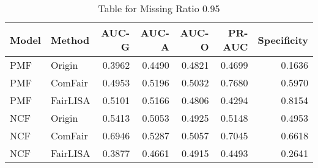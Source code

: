 \begin{table}
\centering
\caption{Table for Missing Ratio 0.95}
\label{tab:missing_0.95}
\begin{tabular}{llrrrrr}
\toprule
Model &   Method &  AUC-G &  AUC-A &  AUC-O &  PR-AUC &  Specificity \\
\midrule
  PMF &   Origin & 0.3962 & 0.4490 & 0.4821 &  0.4699 &       0.1636 \\
  PMF &  ComFair & 0.4953 & 0.5196 & 0.5032 &  0.7680 &       0.5970 \\
  PMF & FairLISA & 0.5101 & 0.5166 & 0.4806 &  0.4294 &       0.8154 \\
  NCF &   Origin & 0.5413 & 0.5053 & 0.4925 &  0.5148 &       0.4953 \\
  NCF &  ComFair & 0.6946 & 0.5287 & 0.5057 &  0.7045 &       0.6618 \\
  NCF & FairLISA & 0.3877 & 0.4661 & 0.4915 &  0.4493 &       0.2641 \\
\bottomrule
\end{tabular}
\end{table}
